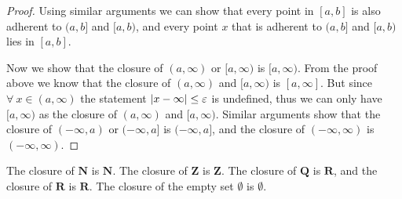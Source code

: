 \begin{proof}
    Using similar arguments we can show that every point in \([a, b]\) is also adherent to \((a, b]\) and \([a, b)\), and every point \(x\) that is adherent to \((a, b]\) and \([a, b)\) lies in \([a, b]\).

    Now we show that the closure of \((a, \infty)\) or \([a, \infty)\) is \([a, \infty)\).
    From the proof above we know that the closure of \((a, \infty)\) and \([a, \infty)\) is \([a, \infty]\).
    But since \(\forall\ x \in (a, \infty)\) the statement \(\abs*{x - \infty} \leq \varepsilon\) is undefined, thus we can only have \([a, \infty)\) as the closure of \((a, \infty)\) and \([a, \infty)\).
                    Similar arguments show that the closure of \((-\infty, a)\) or \((-\infty, a]\) is \((-\infty, a]\), and the closure of \((-\infty, \infty)\) is \((-\infty, \infty)\).
\end{proof}

\begin{lemma}\label{9.1.13}
    The closure of \(\mathbf{N}\) is \(\mathbf{N}\).
    The closure of \(\mathbf{Z}\) is \(\mathbf{Z}\).
    The closure of \(\mathbf{Q}\) is \(\mathbf{R}\), and the closure of \(\mathbf{R}\) is \(\mathbf{R}\).
    The closure of the empty set \(\emptyset\) is \(\emptyset\).
\end{lemma}

